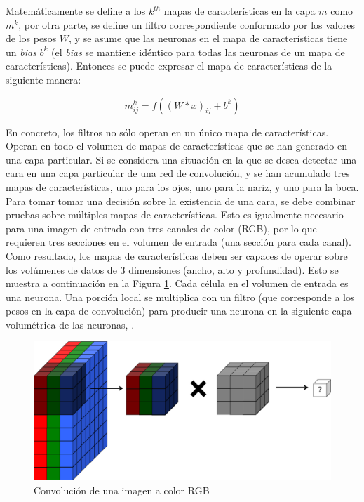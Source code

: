     Matemáticamente se define a los $k^{th}$ mapas de características en la capa $m$ como $m^k$, por otra parte, se define un filtro correspondiente conformado por los valores de los pesos $W$, y se asume que las neuronas en el mapa de características tiene un \textit{bias} $b^k$ (el \textit{bias} se mantiene idéntico para todas las neuronas de un mapa de características). Entonces se puede expresar el mapa de características de la siguiente manera:

    \begin{equation}
		m^k_{ij}=f((W*x)_{ij}+b^k)
	\end{equation}
	
	En concreto, los filtros no sólo operan en un único mapa de características. Operan en todo el volumen de mapas de características que se han generado en una capa particular. Si se considera una situación en la que se desea detectar una cara en una capa particular de una red de convolución, y se han acumulado tres mapas de características, uno para los ojos, uno para la nariz, y uno para la boca. Para tomar tomar una decisión sobre la existencia de una cara, se debe combinar pruebas sobre múltiples mapas de características. Esto es igualmente necesario para una imagen de entrada con tres canales de color (RGB), por lo que requieren tres secciones en el volumen de entrada (una sección para cada canal). Como resultado, los mapas de características deben ser capaces de operar sobre los volúmenes de datos de 3 dimensiones (ancho, alto y profundidad). Esto se muestra a continuación en la Figura \ref{fig:color_conv}. Cada célula en el volumen de entrada es una neurona. Una porción local se multiplica con un filtro (que corresponde a los pesos en la capa de convolución) para producir una neurona en la siguiente capa volumétrica de las neuronas, \cite{dlBook}.
	\begin{figure}[htp]
        \centering
        \includegraphics[scale=0.3]{chapter3/color_conv.png}
        \caption{Convolución de una imagen a color RGB}
        \label{fig:color_conv}
    \end{figure}

